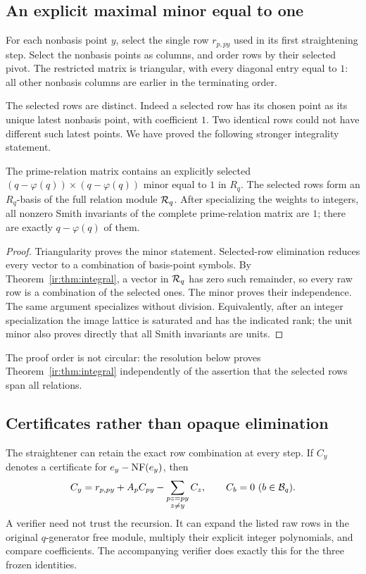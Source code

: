 \subsection{An explicit maximal minor equal to one}
For each nonbasis point $y$, select the single row $r_{p,py}$ used in
its first straightening step. Select the nonbasis points as columns,
and order rows by their selected pivot. The restricted matrix is
triangular, with every diagonal entry equal to $1$: all other nonbasis
columns are earlier in the terminating order.

The selected rows are distinct. Indeed a selected row has its chosen
point as its unique latest nonbasis point, with coefficient $1$. Two
identical rows could not have different such latest points.
We have proved the following stronger integrality statement.

\begin{theorem}
\label{ir:thm:minor}
The prime-relation matrix contains an explicitly selected
$(q-\varphi(q))\times(q-\varphi(q))$ minor equal to $1$ in $R_q$.
The selected rows form an $R_q$-basis of the full relation module
$\mathcal R_q$. After specializing the weights to integers, all nonzero Smith
invariants of the complete prime-relation matrix are $1$; there are
exactly $q-\varphi(q)$ of them.
\end{theorem}
\begin{proof}
Triangularity proves the minor statement. Selected-row elimination
reduces every vector to a combination of basis-point symbols. By
Theorem~\ref{ir:thm:integral}, a vector in $\mathcal R_q$ has zero such
remainder, so every raw row is a combination of the selected ones.
The minor proves their independence. The same argument specializes
without division. Equivalently, after an integer specialization the
image lattice is saturated and has the indicated rank; the unit minor
also proves directly that all Smith invariants are units.
\end{proof}
The proof order is not circular: the resolution below proves
Theorem~\ref{ir:thm:integral} independently of the assertion that the
selected rows span all relations.

\subsection{Certificates rather than opaque elimination}
The straightener can retain the exact row combination at every step.
If $C_y$ denotes a certificate for $e_y-\operatorname{NF}(e_y)$, then
\begin{equation}\label{ir:eq:certificate-recursion}
 C_y=r_{p,py}+A_pC_{py}-\sum_{\substack{pz=py\\z\ne y}}C_z,
 \qquad C_b=0\ (b\in\mathcal B_q).
\end{equation}
A verifier need not trust the recursion. It can expand the listed raw
rows in the original $q$-generator free module, multiply their explicit
integer polynomials, and compare coefficients. The accompanying
verifier does exactly this for the three frozen identities.

